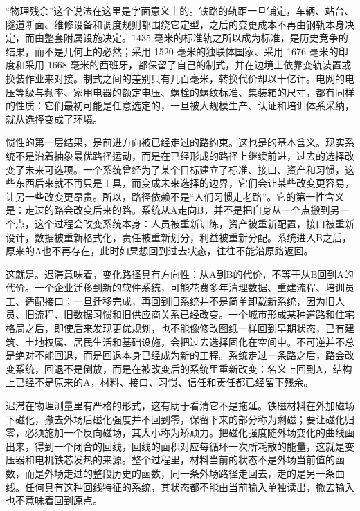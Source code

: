 “物理残余”这个说法在这里是字面意义上的。铁路的轨距一旦铺定，车辆、站台、隧道断面、维修设备和调度规则都围绕它定型，之后的变更成本不再由钢轨本身决定，而由整套附属设施决定。1435 毫米的标准轨之所以成为标准，是历史竞争的结果，而不是几何上的必然；采用 1520 毫米的独联体国家、采用 1676 毫米的印度和采用 1668 毫米的西班牙，都保留了自己的制式，并在边境上依靠变轨装置或换装作业来对接。制式之间的差别只有几百毫米，转换代价却以十亿计。电网的电压等级与频率、家用电器的额定电压、螺栓的螺纹标准、集装箱的尺寸，都有同样的性质：它们最初可能是任意选定的，一旦被大规模生产、认证和培训体系采纳，就从选择变成了环境。


惯性的第一层结果，是前进方向被已经走过的路约束。这也是的基本含义。现实系统不是沿着抽象最优路径运动，而是在已经形成的路径上继续前进，过去的选择改变了未来可选项\cite{david1985clio}。一个系统曾经为了某个目标建立了标准、接口、资产和习惯，这些东西后来就不再只是工具，而变成未来选择的边界，它们会让某些改变更容易，让另一些改变更昂贵。所以，路径依赖不是“人们习惯走老路”。它的第一性含义是：走过的路会改变后来的路。系统从A走向B，并不是把自身从一个点搬到另一个点，这个过程会改变系统本身：人员被重新训练，资产被重新配置，接口被重新设计，数据被重新格式化，责任被重新划分，利益被重新分配。系统进入B之后，原来的A也不再存在，此时如果想回到过去状态，往往不能沿原路返回。

这就是。迟滞意味着，变化路径具有方向性：从A到B的代价，不等于从B回到A的代价。一个企业迁移到新的软件系统，可能花费多年清理数据、重建流程、培训员工、适配接口；一旦迁移完成，再回到旧系统并不是简单卸载新系统，因为旧人员、旧流程、旧数据习惯和旧供应商关系已经改变。一个城市形成某种道路和住宅格局之后，即使后来发现更优规划，也不能像修改图纸一样回到早期状态，已有建筑、土地权属、居民生活和基础设施，会把过去选择固化在空间中。不可逆并不总是绝对不能回退，而是回退本身已经成为新的工程。系统走过一条路之后，路会改变系统，回退不是倒放，而是在被改变后的系统里重新改变：名义上回到A，结构上已经不是原来的A，材料、接口、习惯、信任和责任都已经留下残余。

迟滞在物理测量里有严格的形式，这有助于看清它不是拖延。铁磁材料在外加磁场下磁化，撤去外场后磁化强度并不回到零，保留下来的部分称为剩磁；要让磁化归零，必须施加一个反向磁场，其大小称为矫顽力。把磁化强度随外场变化的曲线画出来，得到一个闭合的回线，回线的面积对应每循环一次所耗散的能量，这就是变压器和电机铁芯发热的来源。整个过程里，材料当前的状态不是外场当前值的函数，而是外场走过的整段历史的函数，同一条外场路径走回去，走的是另一条曲线。任何具有这种回线特征的系统，其状态都不能由当前输入单独读出，撤去输入也不意味着回到原点。

